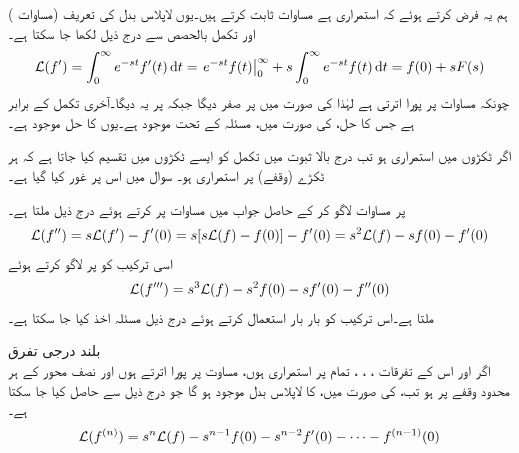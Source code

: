 ہم یہ  فرض کرتے ہوئے  کہ   استمراری ہے مساوات  ثابت کرتے ہیں۔یوں لاپلاس بدل کی تعریف (مساوات ) اور تکمل بالحصص سے درج ذیل لکھا جا سکتا ہے۔
\begin{align*}
\Laplace(f')=\int_{0}^{\infty} e^{-st} f'(t)\dif t=\left. e^{-st} f(t) \right|_{0}^{\infty}+s\int_{0}^{\infty} e^{-st}f(t)\dif t=f(0)+sF(s)
\end{align*}
چونکہ  مساوات  پر پورا اترتی ہے لہٰذا  کی صورت میں   پر صفر دیگا جبکہ  پر یہ  دیگا۔آخری تکمل  کے برابر ہے  جس کا حل،  کی  صورت میں، مسئلہ  کے تحت موجود ہے۔یوں  کا حل موجود ہے۔

اگر  ٹکڑوں میں استمراری ہو تب درج بالا ثبوت میں تکمل کو ایسے ٹکڑوں میں تقسیم کیا جاتا ہے کہ ہر ٹکڑے (وقفے) پر  استمراری ہو۔ سوال  میں اس پر غور کیا گیا ہے۔

 پر مساوات   لاگو کر کے حاصل جواب میں مساوات  پر کرتے ہوئے درج ذیل ملتا ہے۔
\begin{align}\label{مساوات_لاپلاس_درجہ_دوم_تفرق}
\mathcal{L}(f'')=s\mathcal{L}(f')-f'(0)=s[s\mathcal{L}(f)-f(0)]-f'(0)=s^2\mathcal{L}(f)-sf(0)-f'(0)
\end{align}
اسی ترکیب کو  پر لاگو کرتے ہوئے
\begin{align}\label{مساوات_لاپلاس_درجہ_تین_تفرق}
\mathcal{L}(f''')=s^3\mathcal{L}(f)-s^2f(0)-sf'(0)-f''(0)
\end{align}
ملتا ہے۔اس ترکیب کو بار بار استعمال کرتے ہوئے درج ذیل مسئلہ اخذ کیا جا سکتا ہے۔

\quad بلند درجی تفرق \\
اگر  اور اس کے تفرقات ، ، ،   تمام  پر استمراری ہوں، مساوت  پر پورا اترتے ہوں اور  نصف محور  کے ہر محدود وقفے پر  ہو تب،  کی صورت میں،  کا لاپلاس بدل موجود ہو گا جو درج ذیل سے حاصل کیا جا سکتا ہے۔
\begin{align}
\mathcal{L}(f^{(n)})=s^n\mathcal{L}(f)-s^{n-1}f(0)-s^{n-2}f'(0)-\cdots -f^{(n-1)}(0)
\end{align}


